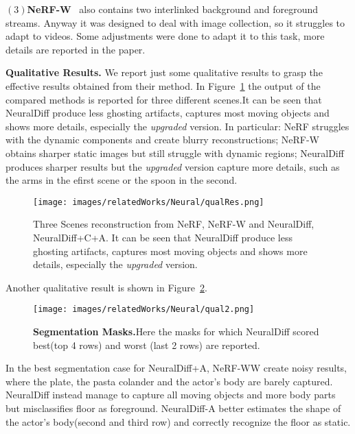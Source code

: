 $(3)$\textbf{NeRF-W}~\cite{ndiff_17} also contains two interlinked background and foreground
streams. Anyway it was designed to deal with image collection, so it struggles to 
adapt to videos. Some adjustments were done to adapt it to this task, more details
are reported in the paper.


\textbf{Qualitative Results.} We report just some qualitative results to grasp the effective 
results obtained from their method. In Figure~\ref{fig:ndiff_qualitative} the output of the compared
methods is reported for three different scenes.It can be seen that NeuralDiff produce less ghosting artifacts,
captures most moving objects and shows more details, especially the \textit{upgraded} version.
In particular: NeRF struggles with the dynamic components and create blurry
reconstructions; NeRF-W obtains sharper static images but still struggle with
dynamic regions; NeuralDiff produces sharper results but the \textit{upgraded}
version capture more details, such as the arms in the efirst scene or the spoon in the
second.
\begin{figure}[t]
    \centering
    \texttt{[image: images/relatedWorks/Neural/qualRes.png]} 
    \caption{Three Scenes reconstruction from NeRF, NeRF-W and NeuralDiff, NeuralDiff+C+A.
     It can be seen that NeuralDiff produce less ghosting artifacts, captures most moving
     objects and shows more details, especially the \textit{upgraded} version.}\label{fig:ndiff_qualitative}
\end{figure}
Another qualitative result is shown in Figure~\ref{fig:qual2}.
\begin{figure}[t]
    \centering
    \texttt{[image: images/relatedWorks/Neural/qual2.png]} 
    \caption{\textbf{Segmentation Masks.}Here the masks for which NeuralDiff scored best(top 4 rows)
    and worst (last 2 rows) are reported.}\label{fig:qual2}
\end{figure}
In the best segmentation case for NeuralDiff+A, NeRF-WW create noisy results, where 
the plate, the pasta colander and the actor's body are barely captured. NeuralDiff 
instead manage to capture all moving objects and more body parts but misclassifies 
floor as foreground. NeuralDiff-A better estimates the shape of the actor's body(second and third row)
and correctly recognize the floor as static.

